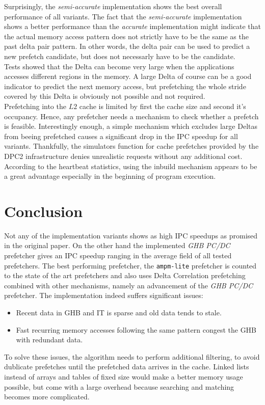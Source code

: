\documentclass{article}
\begin{document}
Surprisingly, the \textit{semi-accurate} implementation shows the best overall performance of all variants. The fact that the \textit{semi-accurate} implementation shows a better performance than the \textit{accurate} implementation might indicate that the actual memory access pattern does not strictly have to be the same as the past delta pair pattern. In other words, the delta pair can be used to predict a new prefetch candidate, but does not necessarly have to be the candidate. \\
Tests showed that the Delta can become very large when the applications accesses different regions in the memory. 
A large Delta of course can be a good indicator to predict the next memory access, but prefetching the whole stride covered by this Delta is obviously not possible and not required.  \\
Prefetching into the $L2$ cache is limited by first the cache size and second it's occupancy. 
Hence, any prefetcher needs a mechanism to check whether a prefetch is feasible. 
Interestingly enough, a simple mechanism which excludes large Deltas from beeing prefetched causes a significant drop in the IPC speedup for all variants. 
Thankfully, the simulators function for cache prefetches provided by the DPC2 infrastructure denies unrealistic requests without any additional cost. 
According to the heartbeat statistics, using the inbuild mechanism appears to be a great advantage especially in the beginning of program execution.


\section{Conclusion}
Not any of the implementation variants shows as high IPC speedups as promised in the original paper. On the other hand the implemented \textit{GHB PC/DC} prefetcher gives an IPC speedup ranging in the average field of all tested prefetchers. The best performing prefetcher, the \texttt{ampm-lite} prefetcher is counted to the state of the art prefetchers and also uses Delta Correlation prefetching combined with other mechanisms, namely an advancement of the \textit{GHB PC/DC} prefetcher.
The implementation indeed suffers significant issues: 
\begin{itemize}
	\item Recent data in GHB and IT is sparse and old data tends to stale. 
	\item Fast recurring memory accesses following the same pattern congest the GHB with redundant data. 
\end{itemize}
To solve these issues, the algorithm needs to perform additional filtering, to avoid dublicate prefetches until the prefetched data arrives in the cache. 
Linked lists instead of arrays and tables of fixed size would make a better memory usage possible, but come with a large overhead because searching and matching becomes more complicated.




\end{document}
